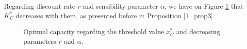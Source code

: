 Regarding discount rate $r$ and sensibility parameter $\alpha$, we have on Figure \ref{fig:k2} that $K^*_C$ decreases with them, as presented before in Proposition \ref{1_prop3}.
 
\begin{figure}[!htb]
	\begin{subfigmatrix}{2}
	\end{subfigmatrix}
	\caption{Optimal capacity regarding the threshold value $x^*_C$ and decreasing parameters $r$ and $\alpha$.}
	\label{fig:k2}
\end{figure}